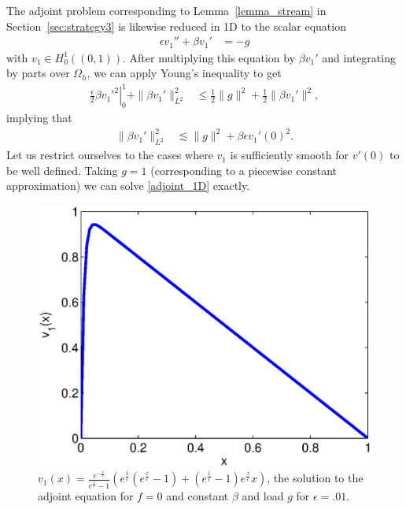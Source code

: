 \documentclass[11pt,onecolumn]{scrartcl}
\newcommand{\Oh}{\Omega_h}
\begin{document}
The adjoint problem corresponding to Lemma~\ref{lemma_stream} in Section~\ref{sec:strategy3} is likewise reduced in 1D to the scalar equation
\begin{align}
\epsilon v_1'' + \beta v_1' &= -g \label{adjoint_1D}
\end{align}
with $v_1\in H^1_0\left((0,1)\right)$.  After multiplying this equation by $\beta v_1'$ and integrating by parts over $\Oh$, we can apply Young's inequality to get
\begin{align*}
\left.\frac{\epsilon}{2} \beta v_1'^2\right|_0^1 + \|\beta v_1'\|_{L^2}^2 &\leq \frac{1}{2}\|g\|^2 + \frac{1}{2}\|\beta v_1'\|^2,
\end{align*}
implying that
\begin{align*}
\|\beta v_1'\|_{L^2}^2 & \lesssim \|g\|^2 + {\beta \epsilon} v_1'(0)^2.
\end{align*}
Let us restrict ourselves to the cases where $v_1$ is sufficiently smooth for $v'(0)$ to be well defined.  Taking $g=1$ (corresponding to a piecewise constant approximation) we can solve \eqref{adjoint_1D} exactly. 
\begin{figure}
\centering
\includegraphics[scale=.5]{figs/testBoundary1D.eps}
\caption{$v_1(x) = \frac{e^{-\frac{x}{\epsilon}}}{e^{\frac{1}{\epsilon}}-1}\left(e^{\frac{1}{\epsilon}}\left(e^{\frac{x}{\epsilon}}-1\right) + \left(e^{\frac{1}{\epsilon}}-1\right)e^{\frac{x}{\epsilon}}x\right)$, the solution to the adjoint equation for $f=0$ and constant $\beta$ and load $g$ for $\epsilon = .01$.}
\label{fig:testBoundary1D}
\end{figure}
\end{document}

